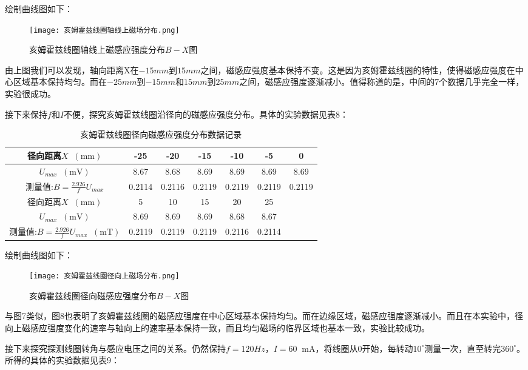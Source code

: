 \documentclass[11pt]{article}
\newcommand*{\unit}[1]{\mathop{}\!\mathrm{#1}}
\begin{document}
绘制曲线图如下：

\begin{figure}[H]
  \centering
  \texttt{[image: 亥姆霍兹线圈轴线上磁场分布.png]}
  \caption{亥姆霍兹线圈轴线上磁感应强度分布$B-X$图}
\end{figure}

由上图我们可以发现，轴向距离X在$-15mm$到$15mm$之间，磁感应强度基本保持不变。这是因为亥姆霍兹线圈的特性，使得磁感应强度在中心区域基本保持均匀。而在$-25mm$到$-15mm$和$15mm$到$25mm$之间，磁感应强度逐渐减小。值得称道的是，中间的7个数据几乎完全一样，实验很成功。

接下来保持$f$和$I$不便，探究亥姆霍兹线圈沿径向的磁感应强度分布。具体的实验数据见表8：

\begin{table}[H]
  \centering
  \caption{亥姆霍兹线圈径向磁感应强度分布数据记录}
  \begin{tabular}{|c|c|c|c|c|c|c|}
      \hline
      径向距离$X\unit{(mm)}$&-25&-20&-15&-10&-5&0\\ \hline
      $U_{max}\unit{(mV)}$&8.67  & 8.68  & 8.69  & 8.69  & 8.69  & 8.69 \\ \hline
      测量值:$B = \frac{2.926}{f} U_{max}$&0.2114  & 0.2116  & 0.2119  & 0.2119  & 0.2119  & 0.2119  \\ \hline
      径向距离$X\unit{(mm)}$&5&10&15&20&25&\\ \hline
      $U_{max}\unit{(mV)}$&8.69  & 8.69  & 8.69  & 8.68  & 8.67 &\\ \hline
      测量值:$B = \frac{2.926}{f} U_{max} \unit{(mT)}$&0.2119  & 0.2119  & 0.2119  & 0.2116  & 0.2114  &\\ \hline
  \end{tabular}
\end{table}

绘制曲线图如下：

\begin{figure}[H]
  \centering
  \texttt{[image: 亥姆霍兹线圈径向上磁场分布.png]}
  \caption{亥姆霍兹线圈径向磁感应强度分布$B-X$图}
\end{figure}

与图7类似，图8也表明了亥姆霍兹线圈的磁感应强度在中心区域基本保持均匀。而在边缘区域，磁感应强度逐渐减小。而且在本实验中，径向上磁感应强度变化的速率与轴向上的速率基本保持一致，而且均匀磁场的临界区域也基本一致，实验比较成功。

接下来探究探测线圈转角与感应电压之间的关系。仍然保持$f = 120Hz，I = 60 \unit{mA}$，将线圈从$0$开始，每转动$10^\circ$测量一次，直至转完$360^\circ$。所得的具体的实验数据见表9：
\end{document}
